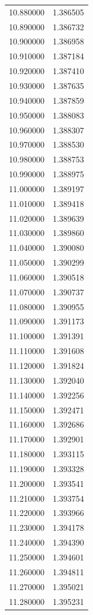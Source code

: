 \begin{tabular}{rr}
10.880000 & 1.386505 \\
10.890000 & 1.386732 \\
10.900000 & 1.386958 \\
10.910000 & 1.387184 \\
10.920000 & 1.387410 \\
10.930000 & 1.387635 \\
10.940000 & 1.387859 \\
10.950000 & 1.388083 \\
10.960000 & 1.388307 \\
10.970000 & 1.388530 \\
10.980000 & 1.388753 \\
10.990000 & 1.388975 \\
11.000000 & 1.389197 \\
11.010000 & 1.389418 \\
11.020000 & 1.389639 \\
11.030000 & 1.389860 \\
11.040000 & 1.390080 \\
11.050000 & 1.390299 \\
11.060000 & 1.390518 \\
11.070000 & 1.390737 \\
11.080000 & 1.390955 \\
11.090000 & 1.391173 \\
11.100000 & 1.391391 \\
11.110000 & 1.391608 \\
11.120000 & 1.391824 \\
11.130000 & 1.392040 \\
11.140000 & 1.392256 \\
11.150000 & 1.392471 \\
11.160000 & 1.392686 \\
11.170000 & 1.392901 \\
11.180000 & 1.393115 \\
11.190000 & 1.393328 \\
11.200000 & 1.393541 \\
11.210000 & 1.393754 \\
11.220000 & 1.393966 \\
11.230000 & 1.394178 \\
11.240000 & 1.394390 \\
11.250000 & 1.394601 \\
11.260000 & 1.394811 \\
11.270000 & 1.395021 \\
11.280000 & 1.395231 \\

\end{tabular}
